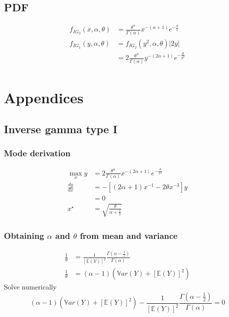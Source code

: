 \documentclass{article}
\begin{document}
\subsection{PDF}
\begin{align*}
f_{IG_2}(x, \alpha, \theta) &=
                      \frac{\theta^\alpha}{\Gamma(\alpha)}x^{-(\alpha+1)}e^{-\frac{\theta}{x}}\\
  f_{IG_1}(y, \alpha, \theta) &= f_{IG_2}(y^2, \alpha, \theta)|2y|\\
  &= 2\frac{\theta^\alpha}{\Gamma(\alpha)}y^{-(2\alpha+1)}e^{-\frac{\theta}{y^2}}\\
\end{align*}

\section*{Appendices}
\subsection*{Inverse gamma type I}
\subsubsection*{Mode derivation}
\begin{align*}
  \max_x y &=
             2\frac{\theta^\alpha}{\Gamma(\alpha)}x^{-(2\alpha+1)}e^{-\frac{\theta}{x^2}}\\
  \frac{dy}{dx} &= -\left[(2\alpha+1)x^{-1}-2\theta x^{-3}\right]y\\
           &= 0\\
  x^\star &= \sqrt{\frac{\theta}{\alpha + \frac{1}{2}}}
\end{align*}
\subsubsection*{Obtaining $\alpha$ and $\theta$ from mean and
  variance}
\begin{align*}
  \frac{1}{\theta} &=
  \frac{1}{\left[\mathbb{E}(Y)\right]^2}\frac{\Gamma(\alpha-\frac{1}{2})}{\Gamma(\alpha)}\\
  \frac{1}{\theta} &= (\alpha - 1)\left(\mathbb{V}ar(Y) + [\mathbb{E}(Y)]^2\right)
\end{align*}
Solve numerically
\[
(\alpha - 1)\left(\mathbb{V}ar(Y) + [\mathbb{E}(Y)]^2\right)-
\frac{1}{\left[\mathbb{E}(Y)\right]^2}\frac{\Gamma(\alpha-\frac{1}{2})}{\Gamma(\alpha)} =0
\]
\end{document}
